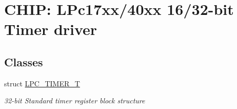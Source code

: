 \hypertarget{group__TIMER__17XX__40XX}{}\section{C\+H\+IP\+: L\+Pc17xx/40xx 16/32-\/bit Timer driver}
\label{group__TIMER__17XX__40XX}
\subsection*{Classes}
\begin{DoxyCompactItemize}
\item 
struct \hyperlink{structLPC__TIMER__T}{L\+P\+C\+\_\+\+T\+I\+M\+E\+R\+\_\+T}
\begin{DoxyCompactList}\small\item\em 32-\/bit Standard timer register block structure \end{DoxyCompactList}\end{DoxyCompactItemize}

